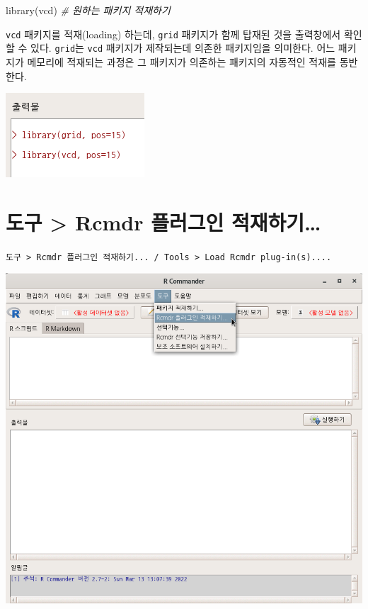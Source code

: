\documentclass[
]{book}
\newenvironment{Shaded}{\begin{snugshade}}{\end{snugshade}}
\newcommand{\CommentTok}[1]{\textcolor[rgb]{0.56,0.35,0.01}{\textit{#1}}}
\newcommand{\FunctionTok}[1]{\textcolor[rgb]{0.00,0.00,0.00}{#1}}
\newcommand{\NormalTok}[1]{#1}
\begin{document}
\begin{Shaded}
\begin{Highlighting}[]
\FunctionTok{library}\NormalTok{(vcd) }\CommentTok{\# 원하는 패키지 적재하기}
\end{Highlighting}
\end{Shaded}

\texttt{vcd} 패키지를 적재(loading) 하는데, \texttt{grid} 패키지가 함께 탑재된 것을 출력창에서 확인할 수 있다.
\texttt{grid}는 \texttt{vcd} 패키지가 제작되는데 의존한 패키지임을 의미한다.
어느 패키지가 메모리에 적재되는 과정은 그 패키지가 의존하는 패키지의 자동적인 적재를 동반한다.

\includegraphics{fig/tools-load-pkg-03.png}

\hypertarget{uxb3c4uxad6c-rcmdr-uxd50cuxb7ecuxadf8uxc778-uxc801uxc7acuxd558uxae30}{%
\section{도구 \textgreater{} Rcmdr 플러그인 적재하기\ldots{}}\label{uxb3c4uxad6c-rcmdr-uxd50cuxb7ecuxadf8uxc778-uxc801uxc7acuxd558uxae30}}

\texttt{도구\ \textgreater{}\ Rcmdr\ 플러그인\ 적재하기...\ /\ Tools\ \textgreater{}\ Load\ Rcmdr\ plug-in(s)....}

\includegraphics{fig/tools-load-plugin-01.png}
\end{document}

